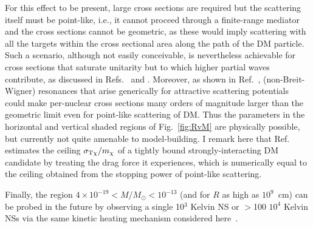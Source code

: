\documentclass[
    twocolumn,
	prd,
        amssymb,
	preprintnumbers,
	secnumarabic,
	nofootinbib,
	superscriptaddress]{revtex4-1}
\begin{document}
For this effect to be present, large cross sections are required but the scattering itself must be point-like, i.e., it cannot proceed through a finite-range mediator and the cross sections cannot be geometric, as these would imply scattering with all the targets within the cross sectional area along the path of the DM particle. 
Such a scenario, although not easily conceivable, is nevertheless achievable for cross sections that saturate unitarity but to which higher partial waves contribute, as discussed in Refs.~\cite{xmaslights:Bramante:2018tos} and \cite{DigmanBarn:2019wdm}.
Moreover, as shown in Ref.~\cite{resonantXuFarrar:2020qjk}, (non-Breit-Wigner) resonances that arise generically for attractive scattering potentials could make per-nuclear cross sections many orders of magnitude larger than the geometric limit even for point-like scattering of DM.
Thus the parameters in the horizontal and vertical shaded regions of Fig.~\ref{fig:RvM} are physically possible, but currently not quite amenable to model-building.
I remark here that Ref.~\cite{MACROSidhu2020} estimates the ceiling $\sigma_{\rm T\chi}/m_\chi$ of a tightly bound strongly-interacting DM candidate by treating the drag force it experiences, which is numerically equal to the ceiling obtained from the stopping power of point-like scattering.

Finally, the region $4 \times 10^{-19} < M/M_\odot < 10^{-13}$ (and for $R$ as high as $10^9$~cm) can be probed in the future by observing a single 10$^3$ Kelvin NS or $>$100 $10^4$ Kelvin NSs via the same kinetic heating mechanism considered here~\cite{NSvIR:clumps2021}.
\end{document}
